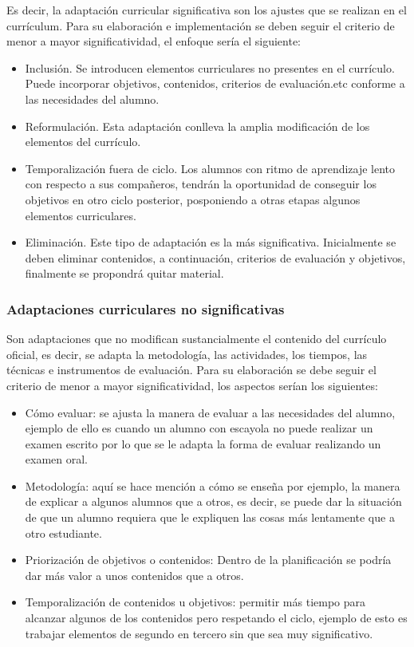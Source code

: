 Es decir, la adaptación curricular significativa son los ajustes que se realizan en el currículum. Para su elaboración e implementación se deben seguir el criterio de menor a mayor significatividad, el enfoque sería el siguiente:
\begin{itemize}
    \item Inclusión. Se introducen elementos curriculares no presentes en el currículo. Puede incorporar objetivos, contenidos, criterios de evaluación.etc conforme a las necesidades del alumno.
    \item Reformulación. Esta adaptación conlleva la amplia modificación de los elementos del currículo.
    \item Temporalización fuera de ciclo. Los alumnos con ritmo de aprendizaje lento con respecto a sus compañeros, tendrán la oportunidad de conseguir los objetivos en otro ciclo posterior, posponiendo a otras etapas algunos elementos curriculares.
    \item Eliminación. Este tipo de adaptación es la más significativa. Inicialmente se deben eliminar contenidos, a continuación, criterios de evaluación y objetivos, finalmente se propondrá quitar material.
\end{itemize}

\subsubsection{Adaptaciones curriculares no significativas}
Son adaptaciones que no modifican sustancialmente el contenido del currículo oficial, es decir, se adapta la metodología, las actividades, los tiempos, las técnicas e instrumentos de evaluación. Para su elaboración se debe  seguir el criterio de menor a mayor significatividad, los aspectos serían los siguientes:
\begin{itemize}
    \item Cómo evaluar: se ajusta la manera de evaluar a las necesidades del alumno, ejemplo de ello es cuando un alumno con escayola no puede realizar un examen escrito por lo que se le adapta la forma de evaluar realizando un examen oral.
    \item Metodología: aquí se hace mención a cómo se enseña por ejemplo, la manera de explicar a algunos alumnos que a otros, es decir, se puede dar la situación de que un alumno requiera que le expliquen las cosas más lentamente que a otro estudiante.
    \item Priorización de objetivos o contenidos: Dentro de la planificación se podría dar más valor a unos contenidos que a otros.
    \item Temporalización de contenidos u objetivos: permitir más tiempo para alcanzar algunos de los contenidos pero respetando el ciclo, ejemplo de esto es trabajar elementos de segundo en tercero sin que sea muy significativo.
\end{itemize}

